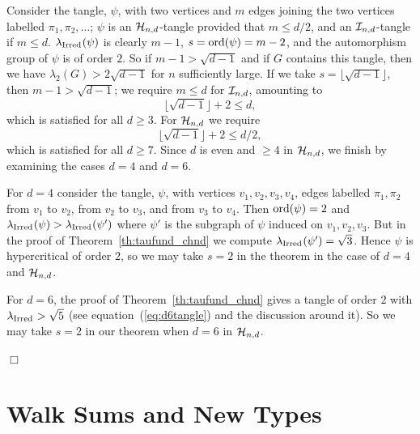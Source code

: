 \documentclass[12pt]{article}
\newcommand{\ord}{{\rm ord}}
\newcommand{\ch}{{\cal H}}
\newcommand{\ci}{{\cal I}}
\newcommand{\cind}{\ci_{n,d}}
\newcommand{\chnd}{\ch_{n,d}}
\newcommand{\tang}{{\psi}}	%
\newcommand{\proofbox}{\begin{flushright}$\Box$\end{flushright}}
\newcommand{\ird}[1]{{\rm Irred}_{#1}}
\begin{document}
Consider the tangle, $\tang$,
with two vertices and $m$ edges joining the two vertices
labelled $\pi_1,\pi_2,\ldots$; $\tang$ is an $\chnd$-tangle
provided that $m\le d/2$, and an $\cind$-tangle if $m\le d$.  
$\lambda_{\ird{}}(\tang)$
is clearly $m-1$, $s=\ord(\tang)=m-2$, and the automorphism group of
$\tang$ is of order $2$.
So if $m-1>\sqrt{d-1}$ and if $G$ contains
this tangle, then we have 
$\lambda_2(G)>2\sqrt{d-1}$ for $n$ sufficiently large.
If we take $s=\lfloor \sqrt{d-1}\rfloor$, then $m-1>\sqrt{d-1}$; we
require $m\le d$ for $\cind$, amounting to
$$
\lfloor \sqrt{d-1}\rfloor + 2 \le d,
$$
which is satisfied for all $d\ge 3$.  For $\chnd$ we require
$$
\lfloor \sqrt{d-1}\rfloor + 2 \le d/2,
$$
which is satisfied for all $d\ge 7$.  Since $d$ is even and $\ge 4$ in
$\chnd$, we finish by examining the cases $d=4$ and $d=6$.

For $d=4$ consider the tangle, $\tang$, with vertices $v_1,v_2,v_3,v_4$,
edges labelled $\pi_1,\pi_2$ from $v_1$ to $v_2$, from $v_2$ to $v_3$,
and from $v_3$ to $v_4$.
Then ${\rm ord}(\tang)=2$ and $\lambda_{\ird{}}(\tang)>
\lambda_{\ird{}}(\tang')$ where $\tang'$ is the subgraph of $\tang$
induced on $v_1,v_2,v_3$.
But in the proof of Theorem~\ref{th:taufund_chnd} we compute
$\lambda_{\ird{}}(\tang')=\sqrt{3}$.  Hence $\tang$ is hypercritical
of order $2$, so we may take $s=2$ in the theorem in the case of $d=4$
and $\chnd$.

For $d=6$, the proof of Theorem~\ref{th:taufund_chnd} gives a tangle
of order $2$ with $\lambda_{\ird{}}>\sqrt{5}$
(see equation~(\ref{eq:d6tangle}) and the discussion around it).  
So we may take
$s=2$ in our theorem when $d=6$ in $\chnd$.

\proofbox





\section{Walk Sums and New Types}
\label{se:newtypes}
\end{document}
